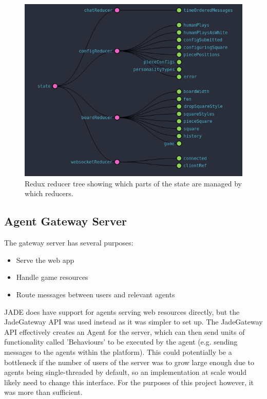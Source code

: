 \documentclass{article}
\begin{document}
\begin{figure}[!ht]
	\centering
	\includegraphics[width=\linewidth]{images/reducers}
	\caption{Redux reducer tree showing which parts of the state are managed by which reducers.}
	\label{fig:reducers}
\end{figure}

\subsection{Agent Gateway Server}

The gateway server has several purposes: 
\begin{itemize}
	\item{Serve the web app}
	\item{Handle game resources}
	\item{Route messages between users and relevant agents}
\end{itemize}

JADE does have support for agents serving web resources directly, but the JadeGateway API was used instead as it was simpler to set up. The JadeGateway API effectively creates an Agent for the server, which can then send units of functionality called 'Behaviours' to be executed by the agent (e.g. sending messages to the agents within the platform). This could potentially be a bottleneck if the number of users of the server was to grow large enough due to agents being single-threaded by default, so an implementation at scale would likely need to change this interface. For the purposes of this project however, it was more than sufficient.
\end{document}
